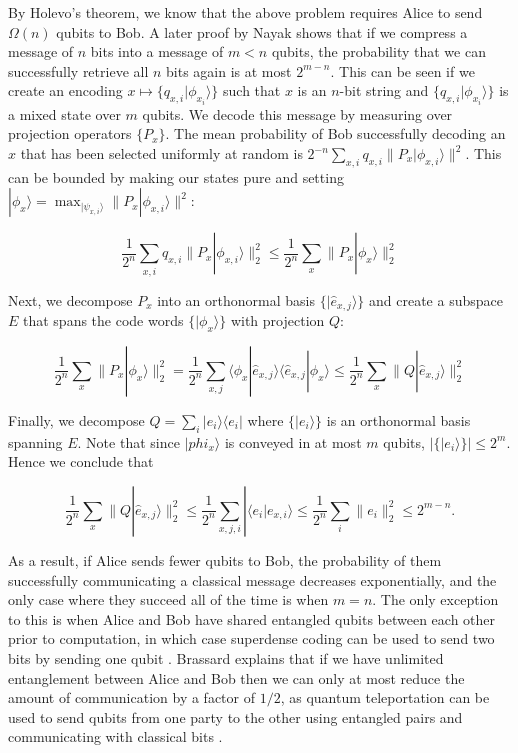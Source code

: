 \documentclass[a4paper]{article}
\begin{document}
        By Holevo's theorem, we know that the above problem requires Alice to send $\Omega(n)$ qubits to Bob. A later proof by Nayak \cite{814608} shows that if we compress a message of $n$ bits into a message of $m < n$ qubits, the probability that we can successfully retrieve all $n$ bits again is at most $2^{m-n}$. This can be seen if we create an encoding $x \mapsto \{q_{x,i}|\phi_{x_i}\rangle\}$ such that $x$ is an $n$-bit string and $\{q_{x,i}|\phi_{x_i}\rangle\}$ is a mixed state over $m$ qubits. We decode this message by measuring over projection operators $\{P_x\}$. The mean probability of Bob successfully decoding an $x$ that has been selected uniformly at random is $2^{-n}\sum_{x, i}q_{x, i}\|P_x|\phi_{x,i}\rangle\|^2$. This can be bounded by making our states pure and setting $|\phi_x\rangle = \max_{|\psi_{x, i}\rangle}\|P_x|\phi_{x, i}\rangle\|^2$:

        $$\frac{1}{2^n}\sum_{x, i}q_{x, i}\|P_x|\phi_{x,i}\rangle\|_2^2 \leq \frac{1}{2^n}\sum_{x}\|P_x|\phi_{x}\rangle\|_2^2$$

        Next, we decompose $P_x$ into an orthonormal basis $\{|\hat{e}_{x, j}\rangle\}$ and create a subspace $E$ that spans the code words $\{|\phi_x\rangle\}$ with projection $Q$:

        $$\frac{1}{2^n}\sum_{x}\|P_x|\phi_{x}\rangle\|_2^2 = \frac{1}{2^n}\sum_{x, j}\langle\phi_x|\hat{e}_{x, j}\rangle\langle\hat{e}_{x, j}|\phi_x\rangle \leq \frac{1}{2^n}\sum_{x}\|Q|\hat{e}_{x, j}\rangle\|_2^2$$

        Finally, we decompose $Q = \sum_i|e_i\rangle\langle e_i|$ where $\{|e_i\rangle\}$ is an orthonormal basis spanning $E$. Note that since $|phi_x\rangle$ is conveyed in at most $m$ qubits, $|\{|e_i\rangle\}| \leq 2^m$. Hence we conclude that

        $$\frac{1}{2^n}\sum_{x}\|Q|\hat{e}_{x, j}\rangle\|_2^2 \leq \frac{1}{2^n}\sum_{x, j, i}|\langle e_i|e_{x, i}\rangle \leq \frac{1}{2^n}\sum_{i}\|e_i\|_2^2 \leq 2^{m - n}.$$

        As a result, if Alice sends fewer qubits to Bob, the probability of them successfully communicating a classical message decreases exponentially, and the only case where they succeed all of the time is when $m = n$. The only exception to this is when Alice and Bob have shared entangled qubits between each other prior to computation, in which case superdense coding can be used to send two bits by sending one qubit \cite{PhysRevLett.69.2881}. Brassard \cite{quant-ph/0101005} explains that if we have unlimited entanglement between Alice and Bob then we can only at most reduce the amount of communication by a factor of $1/2$, as quantum teleportation can be used to send qubits from one party to the other using entangled pairs and communicating with classical bits \cite{PhysRevLett.70.1895}.
\end{document}
